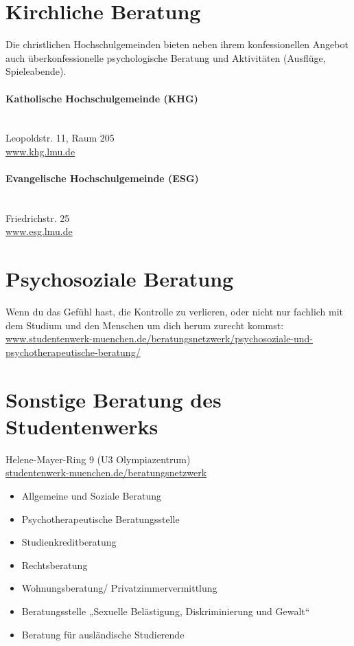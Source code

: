 \section{Kirchliche Beratung}
Die christlichen Hochschulgemeinden bieten neben ihrem konfessionellen Angebot auch überkonfessionelle psychologische Beratung und Aktivitäten (Ausflüge, Spieleabende).

\paragraph{Katholische Hochschulgemeinde (KHG)}\hfill\\
Leopoldstr. 11, Raum 205\\
\url{www.khg.lmu.de}

\paragraph{Evangelische Hochschulgemeinde (ESG)}\hfill\\
Friedrichstr. 25\\
\url{www.esg.lmu.de}



\section{Psychosoziale Beratung}

Wenn du das Gefühl hast, die Kontrolle zu verlieren, oder nicht nur fachlich mit
dem Studium und den Menschen um dich herum zurecht kommst:\\
\url{www.studentenwerk-muenchen.de/beratungsnetzwerk/psychosoziale-und-psychotherapeutische-beratung/}


\section{Sonstige Beratung des Studentenwerks}
Helene-Mayer-Ring 9 (U3 Olympiazentrum)\\
\url{studentenwerk-muenchen.de/beratungsnetzwerk}

\begin{itemize}
	\item Allgemeine und Soziale Beratung
	\item Psychotherapeutische Beratungsstelle
	\item Studienkreditberatung
	\item Rechtsberatung
	\item Wohnungsberatung/ Privatzimmervermittlung
	\item Beratungsstelle „Sexuelle Belästigung, Diskriminierung und Gewalt“
	\item Beratung für ausländische Studierende
\end{itemize}


